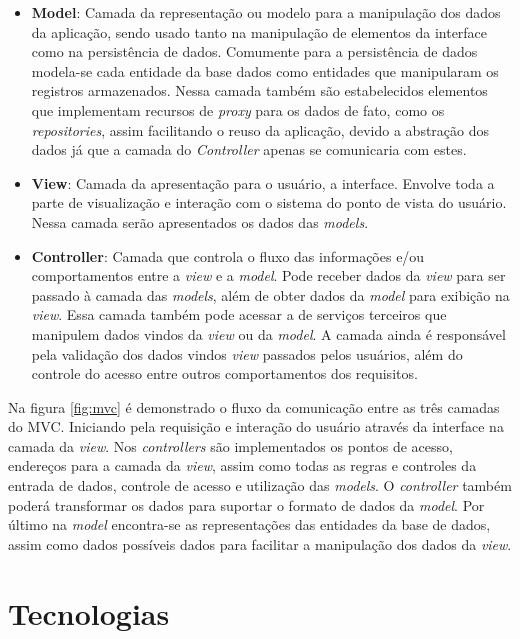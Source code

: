\begin{itemize}
	\item{\textbf{Model}: Camada da representação ou modelo para a manipulação dos dados da aplicação, sendo usado tanto na manipulação de elementos da interface como na persistência de dados. Comumente para a persistência de dados modela-se cada entidade da base dados como entidades que manipularam os registros armazenados. Nessa camada também são estabelecidos elementos que implementam recursos de \textit{proxy} para os dados de fato, como os \textit{repositories}, assim facilitando o reuso da aplicação, devido a abstração dos dados já que a camada do \textit{Controller} apenas se comunicaria com estes.}
	
	\item{\textbf{View}: Camada da apresentação para o usuário, a interface. Envolve toda a parte de visualização e interação com o sistema do ponto de vista do usuário. Nessa camada serão apresentados os dados das \textit{models}.}
	
	\item{\textbf{Controller}: Camada que controla o fluxo das informações e/ou comportamentos entre a \textit{view} e a \textit{model}. Pode receber dados da \textit{view} para ser passado à camada das \textit{models}, além de obter dados da \textit{model} para exibição na \textit{view}. Essa camada também pode acessar a de serviços terceiros que manipulem dados vindos da \textit{view} ou da \textit{model}.  A camada ainda é responsável pela validação dos dados vindos \textit{view} passados pelos usuários, além do controle do acesso entre outros comportamentos dos requisitos.}
\end{itemize}

Na figura \ref{fig:mvc} é demonstrado o fluxo da comunicação entre as três camadas do \ac{MVC}. Iniciando pela requisição e interação do usuário através da interface na camada da \textit{view}. Nos \textit{controllers} são implementados os pontos de acesso, endereços para a camada da \textit{view}, assim como todas as regras e controles da entrada de dados, controle de acesso e utilização das \textit{models}. O \textit{controller} também poderá transformar os dados para suportar o formato de dados da \textit{model}. Por último na \textit{model} encontra-se as representações das entidades da base de dados, assim como dados possíveis dados para facilitar a manipulação dos dados da \textit{view}.

\section{Tecnologias}

